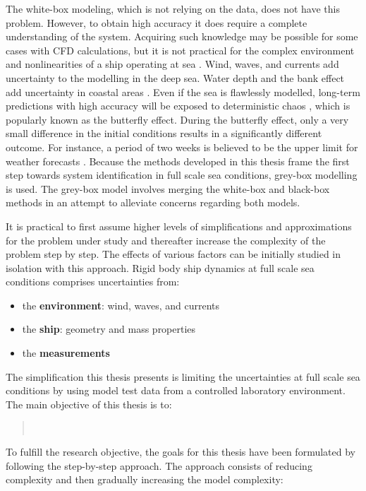 The white-box modeling, which is not relying on the data, does not have this problem. However, to obtain high accuracy it does require a complete understanding of the system. Acquiring such knowledge may be possible for some cases with CFD calculations, but it is not practical for the complex environment and nonlinearities of a ship operating at sea \cite{miller_ship_2021}. 
Wind, waves, and currents add uncertainty to the modelling in the deep sea. Water depth and the bank effect add uncertainty in coastal areas \cite{nielsen_machine_2022}. 
Even if the sea is flawlessly modelled, long-term predictions with high accuracy will be exposed to deterministic chaos \cite{lorenz_deterministic_1963}, which is popularly known as the butterfly effect. During the butterfly effect, only a very small difference in the initial conditions results in a significantly different outcome. For instance, a period of two weeks is believed to be the upper limit for weather forecasts  \cite{zhang_what_2019}. Because the methods developed in this thesis frame the first step towards system identification in full scale sea conditions, grey-box modelling is used. The grey-box model involves merging the white-box and black-box methods in an attempt to alleviate concerns regarding both models. 

It is practical to first assume higher levels of simplifications and approximations for the problem under study and thereafter increase the complexity of the problem step by step. The effects of various factors can be initially studied in isolation with this approach. 
Rigid body ship dynamics at full scale sea conditions comprises uncertainties from:
\vspace{5pt}
\begin{itemize}
    \setlength\itemsep{5pt}
    \item the \textbf{environment}: wind, waves, and currents
    \item the \textbf{ship}: geometry and mass properties
    \item the \textbf{measurements}
\end{itemize}
\vspace{5pt}

\noindent The simplification this thesis presents is limiting the uncertainties at full scale sea conditions by using model test data from a controlled laboratory environment. The main objective of this thesis is to:
\begin{quote}
\vspace{0.1cm}
\objective \\
\vspace{-0.3cm}
\end{quote}
To fulfill the research objective, the goals for this thesis have been formulated by following the step-by-step approach. The approach consists of reducing complexity and then gradually increasing the model complexity:


